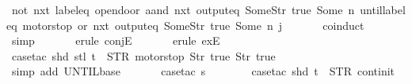 \begin{isabellebody}
\ {\isachardoublequoteopen}{\isacharparenleft}{\isacharparenleft}not\ {\isacharparenleft}nxt\ {\isacharparenleft}label{\isacharunderscore}eq\ {\isacharprime}{\isacharprime}opendoor{\isacharprime}{\isacharprime}\ aand\ {\isacharparenleft}nxt\ {\isacharparenleft}output{\isacharunderscore}eq\ {\isacharbrackleft}Some{\isacharparenleft}Str\ {\isacharprime}{\isacharprime}true{\isacharprime}{\isacharprime}{\isacharparenright}{\isacharcomma}\ Some\ n{\isacharbrackright}{\isacharparenright}{\isacharparenright}{\isacharparenright}{\isacharparenright}{\isacharparenright}\ until{\isacharparenleft}{\isacharparenleft}{\isacharparenleft}label{\isacharunderscore}eq\ {\isacharprime}{\isacharprime}motorstop{\isacharprime}{\isacharprime}{\isacharparenright}\ or\ {\isacharparenleft}nxt\ {\isacharparenleft}output{\isacharunderscore}eq\ {\isacharbrackleft}Some{\isacharparenleft}Str\ {\isacharprime}{\isacharprime}true{\isacharprime}{\isacharprime}{\isacharparenright}{\isacharcomma}\ Some\ n{\isacharbrackright}{\isacharparenright}{\isacharparenright}{\isacharparenright}{\isacharparenright}{\isacharparenright}\ j{\isachardoublequoteclose}\isanewline
\ \ \ \ \ \isamarkupfalse%
\ coinduct\isanewline
\ \ \ \ \ \isamarkupfalse%
\ simp\isanewline
\ \ \ \ \ \isamarkupfalse%
\ {\isacharparenleft}erule\ conjE{\isacharparenright}\isanewline
\ \ \ \ \ \isamarkupfalse%
\ {\isacharparenleft}erule\ exE{\isacharparenright}{\isacharplus}\isanewline
\ \ \ \ \ \isamarkupfalse%
\ {\isacharparenleft}case{\isacharunderscore}tac\ {\isachardoublequoteopen}{\isacharparenleft}shd\ {\isacharparenleft}stl\ t{\isacharparenright}{\isacharparenright}\ {\isacharequal}\ {\isacharparenleft}STR\ {\isacharprime}{\isacharprime}motorstop{\isacharprime}{\isacharprime}{\isacharcomma}\ {\isacharbrackleft}Str\ {\isacharprime}{\isacharprime}true{\isacharprime}{\isacharprime}{\isacharcomma}\ Str\ {\isacharprime}{\isacharprime}true{\isacharprime}{\isacharprime}{\isacharbrackright}{\isacharparenright}{\isachardoublequoteclose}{\isacharparenright}\isanewline
\ \ \ \ \ \isamarkupfalse%
\ {\isacharparenleft}simp\ add{\isacharcolon}\ UNTIL{\isachardot}base{\isacharparenright}\isanewline
\isanewline
\ \ \ \ \ \isamarkupfalse%
\ {\isacharparenleft}case{\isacharunderscore}tac\ {\isachardoublequoteopen}s{\isacharequal}{}{\isachardoublequoteclose}{\isacharparenright}\isanewline
\ \ \ \ \ \ \isamarkupfalse%
\ {\isacharparenleft}case{\isacharunderscore}tac\ {\isachardoublequoteopen}shd\ t\ {\isacharequal}\ {\isacharparenleft}STR\ {\isacharprime}{\isacharprime}continit{\isacharprime}{\isacharprime}{\isacharcomma}\ {\isacharbrackleft}{\isacharbrackright}{\isacharparenright}{\isachardoublequoteclose}{\isacharparenright}\isanewline

\end{isabellebody}

